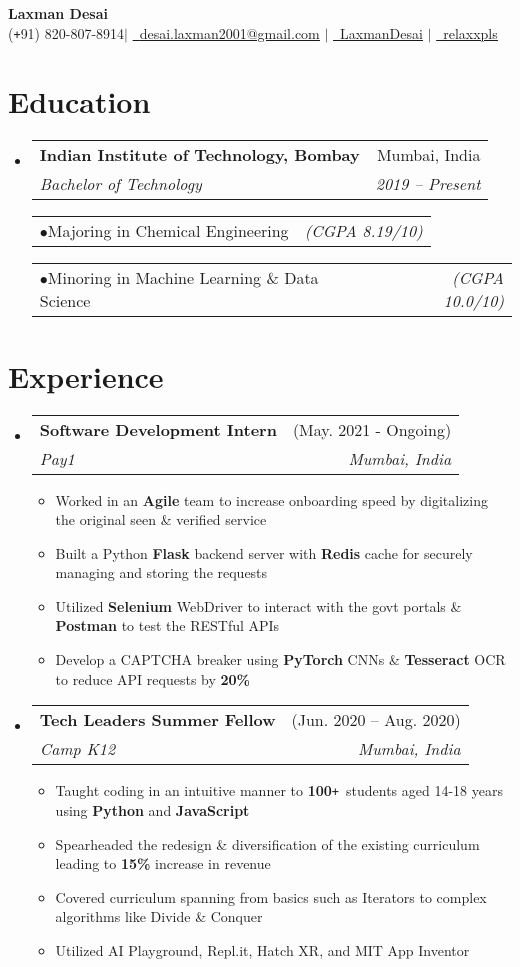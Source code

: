 \documentclass[a4paper,11pt]{article}
\makeatletter
\def\Plus{\texttt{+}}
\newcommand{\resumeItem}[1]{
  \item\small{
    {#1 \vspace{-2pt}}
  }
}
\newcommand{\resumeSubheading}[4]{
  \vspace{-2pt}\item
    \begin{tabular*}{\textwidth}[t]{l@{\extracolsep{\fill}}r}
      \textbf{#1} & #2 \\
      \textit{\small#3} & \textit{\small #4} \\
    \end{tabular*}\vspace{-7pt}
}
\newcommand{\resumeSubHeadingListStart}{\begin{itemize}[leftmargin=-0pt, label={}]}
\newcommand{\resumeSubHeadingListEnd}{\end{itemize}}
\newcommand{\resumeItemListStart}{\begin{itemize}}
\newcommand{\resumeItemListEnd}{\end{itemize}\vspace{-5pt}}
\newcommand{\resumeItemAlt}[2]{
    \begin{tabular*}{0.977\textwidth}{l@{\extracolsep{\fill}}r}
        \tiny{$\bullet$}\hspace{7pt}\small{#1} & \textit{\footnotesize #2} \\
    \end{tabular*}
}
\newcommand{\resumeItemAltListStart}{\begin{adjustwidth}{10.8pt}{}}
\newcommand{\resumeItemAltListEnd}{\end{adjustwidth}}
\makeatother
\begin{document}

\newcommand{\name}{Laxman Desai}
\newcommand{\email}{desai.laxman2001@gmail.com}
\newcommand{\contact}{(\Plus 91) 820-807-8914}
\newcommand{\GithubUsername}{relaxxpls}
\newcommand{\LinkedinUsername}{LaxmanDesai}

\begin{center}
	\textbf{\Huge \name}\\
	\vspace{10pt}
	\small \faMobile* \contact \quad$|$\quad
	\href{mailto:\email}{\faEnvelope\ \underline{\email}} \quad$|$\quad
	\href{https://linkedin.com/in/\LinkedinUsername}{\faLinkedin\ \underline{\LinkedinUsername}} \quad$|$\quad
	\href{https://github.com/\GithubUsername}{\faGithub\ \underline{\GithubUsername}}
\end{center}

\section{Education}
\resumeSubHeadingListStart
  \resumeSubheading
  {Indian Institute of Technology, Bombay}{Mumbai, India}
  {Bachelor of Technology}{2019 -- Present}
  \resumeItemAltListStart
    \resumeItemAlt{Majoring in Chemical Engineering}{(CGPA 8.19/10)}
    \resumeItemAlt{Minoring in Machine Learning \& Data Science}{(CGPA 10.0/10)}
  \resumeItemAltListEnd
\resumeSubHeadingListEnd


\section{Experience}
\resumeSubHeadingListStart
  \resumeSubheading
  {Software Development Intern}{(May. 2021 - Ongoing)}
  {Pay1}{Mumbai, India}
  \resumeItemListStart
    \resumeItem{Worked in an \textbf{Agile} team to increase onboarding speed by digitalizing the original seen \& verified service}
    \resumeItem{Built a Python \textbf{Flask} backend server with \textbf{Redis} cache for securely managing and storing the requests}
    \resumeItem{Utilized \textbf{Selenium} WebDriver to interact with the govt portals \& \textbf{Postman} to test the RESTful APIs} 
    \resumeItem{Develop a CAPTCHA breaker using \textbf{PyTorch} CNNs \& \textbf{Tesseract} OCR to reduce API requests by \textbf{20\%}}
  \resumeItemListEnd

  \resumeSubheading
  {Tech Leaders Summer Fellow}{(Jun. 2020 -- Aug. 2020)}
  {Camp K12}{Mumbai, India}
  \resumeItemListStart
    \resumeItem{Taught coding in an intuitive manner to \textbf{100}\Plus\ students aged 14\hspace{2pt}-\hspace{1pt}18 years using \textbf{Python} and \textbf{JavaScript}}
    \resumeItem{Spearheaded the redesign \& diversification of the existing curriculum leading to \textbf{15\%} increase in revenue}
    \resumeItem{Covered curriculum spanning from basics such as Iterators to complex algorithms like Divide \& Conquer}
    \resumeItem{Utilized AI Playground, Repl.it, Hatch XR, and MIT App Inventor}
    \resumeItemListEnd
  \resumeSubHeadingListEnd
\end{document}
